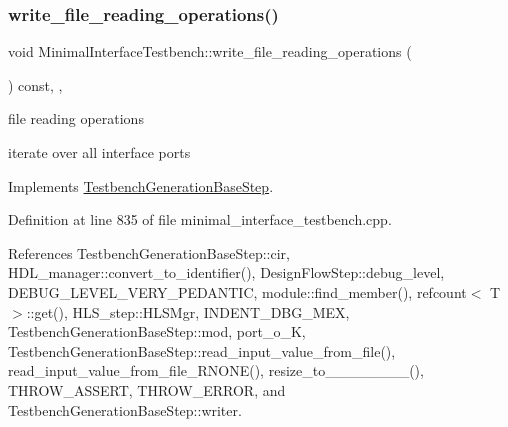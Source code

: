 \subsubsection{\texorpdfstring{write\+\_\+file\+\_\+reading\+\_\+operations()}{write\_file\_reading\_operations()}}
{\footnotesize\ttfamily void Minimal\+Interface\+Testbench\+::write\+\_\+file\+\_\+reading\+\_\+operations (\begin{DoxyParamCaption}{ }\end{DoxyParamCaption}) const\hspace{0.3cm}{\ttfamily [override]}, {\ttfamily [protected]}, {\ttfamily [virtual]}}

file reading operations

iterate over all interface ports 

Implements \hyperlink{classTestbenchGenerationBaseStep_abebc101901191b2ee6732df8c9ecc9ee}{Testbench\+Generation\+Base\+Step}.



Definition at line 835 of file minimal\+\_\+interface\+\_\+testbench.\+cpp.



References Testbench\+Generation\+Base\+Step\+::cir, H\+D\+L\+\_\+manager\+::convert\+\_\+to\+\_\+identifier(), Design\+Flow\+Step\+::debug\+\_\+level, D\+E\+B\+U\+G\+\_\+\+L\+E\+V\+E\+L\+\_\+\+V\+E\+R\+Y\+\_\+\+P\+E\+D\+A\+N\+T\+IC, module\+::find\+\_\+member(), refcount$<$ T $>$\+::get(), H\+L\+S\+\_\+step\+::\+H\+L\+S\+Mgr, I\+N\+D\+E\+N\+T\+\_\+\+D\+B\+G\+\_\+\+M\+EX, Testbench\+Generation\+Base\+Step\+::mod, port\+\_\+o\+\_\+K, Testbench\+Generation\+Base\+Step\+::read\+\_\+input\+\_\+value\+\_\+from\+\_\+file(), read\+\_\+input\+\_\+value\+\_\+from\+\_\+file\+\_\+\+R\+N\+O\+N\+E(), resize\+\_\+to\+\_\+\_\+\_\+\_\+\_\+\_\+\_\+\_(), T\+H\+R\+O\+W\+\_\+\+A\+S\+S\+E\+RT, T\+H\+R\+O\+W\+\_\+\+E\+R\+R\+OR, and Testbench\+Generation\+Base\+Step\+::writer.

